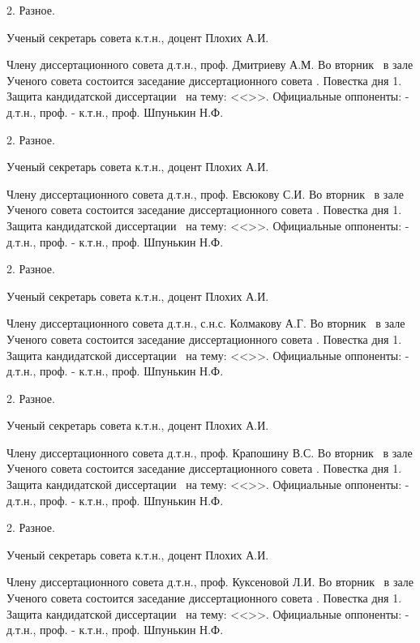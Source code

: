 2.	Разное.

Ученый секретарь совета
к.т.н., доцент		Плохих А.И. 



Члену диссертационного совета
д.т.н., проф. Дмитриеву А.М.
Во вторник \ в зале Ученого совета состоится заседание диссертационного совета .
Повестка дня
1.	Защита кандидатской диссертации \thesisAuthorLastNameKemFull\ на тему: <<\thesisTitle>>.
Официальные оппоненты:	- д.т.н., проф.	\opponentOneFioShort
- к.т.н., проф.	Шпунькин Н.Ф.

2.	Разное.

Ученый секретарь совета
к.т.н., доцент		Плохих А.И. 



Члену диссертационного совета
д.т.н., проф. Евсюкову С.И.
Во вторник \ в зале Ученого совета состоится заседание диссертационного совета .
Повестка дня
1.	Защита кандидатской диссертации \thesisAuthorLastNameKemFull\ на тему: <<\thesisTitle>>.
Официальные оппоненты:	- д.т.н., проф.	\opponentOneFioShort
- к.т.н., проф.	Шпунькин Н.Ф.

2.	Разное.

Ученый секретарь совета
к.т.н., доцент		Плохих А.И. 



Члену диссертационного совета
д.т.н., с.н.с. Колмакову А.Г.
Во вторник \ в зале Ученого совета состоится заседание диссертационного совета .
Повестка дня
1.	Защита кандидатской диссертации \thesisAuthorLastNameKemFull\ на тему: <<\thesisTitle>>.
Официальные оппоненты:	- д.т.н., проф.	\opponentOneFioShort
- к.т.н., проф.	Шпунькин Н.Ф.

2.	Разное.

Ученый секретарь совета
к.т.н., доцент		Плохих А.И. 



Члену диссертационного совета
д.т.н., проф. Крапошину В.С.
Во вторник \ в зале Ученого совета состоится заседание диссертационного совета .
Повестка дня
1.	Защита кандидатской диссертации \thesisAuthorLastNameKemFull\ на тему: <<\thesisTitle>>.
Официальные оппоненты:	- д.т.н., проф.	\opponentOneFioShort
- к.т.н., проф.	Шпунькин Н.Ф.

2.	Разное.

Ученый секретарь совета
к.т.н., доцент		Плохих А.И. 



Члену диссертационного совета
д.т.н., проф. Куксеновой Л.И.
Во вторник \ в зале Ученого совета состоится заседание диссертационного совета .
Повестка дня
1.	Защита кандидатской диссертации \thesisAuthorLastNameKemFull\ на тему: <<\thesisTitle>>.
Официальные оппоненты:	- д.т.н., проф.	\opponentOneFioShort
- к.т.н., проф.	Шпунькин Н.Ф.

